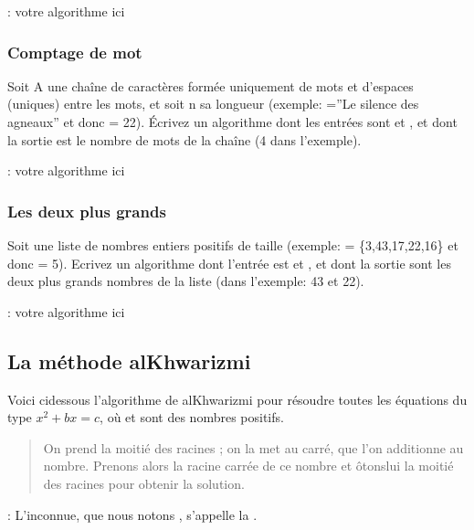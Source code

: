 \documentclass[letterpaper,10pt,english]{sphinxmanual}
\begin{document}
 : votre algorithme ici


\subsubsection{Comptage de mot}
\label{\detokenize{src/OCI_HS1_Algorithmes:comptage-de-mot}}
Soit A une chaîne de caractères formée uniquement de mots et d’espaces (uniques) entre les mots, et soit n sa longueur (exemple:  =”Le silence des agneaux” et donc  = 22). Écrivez un algorithme dont les entrées sont  et , et dont la sortie est le nombre de mots de la chaîne (4 dans l’exemple).

 : votre algorithme ici


\subsubsection{Les deux plus grands}
\label{\detokenize{src/OCI_HS1_Algorithmes:les-deux-plus-grands}}
Soit  une liste de nombres entiers positifs de taille  (exemple:  = \{3,43,17,22,16\} et donc  = 5). Ecrivez un algorithme dont l’entrée est  et , et dont la sortie sont les deux plus grands nombres de la liste (dans l’exemple: 43 et 22).

 : votre algorithme ici


\subsection{La méthode al\sphinxhyphen{}Khwarizmi}
\label{\detokenize{src/OCI_HS1_Algorithmes:la-methode-al-khwarizmi}}
Voici ci\sphinxhyphen{}dessous l’algorithme de al\sphinxhyphen{}Khwarizmi pour résoudre toutes les équations du type  \(x^2 + bx = c\), où  et  sont des nombres positifs.
\begin{quote}

On prend la moitié des racines ; on la met au carré, que l’on additionne au nombre.
Prenons alors la racine carrée de ce nombre et ôtons\sphinxhyphen{}lui la moitié des racines pour obtenir la solution.
\end{quote}

 : L’inconnue, que nous notons , s’appelle la .
\end{document}
